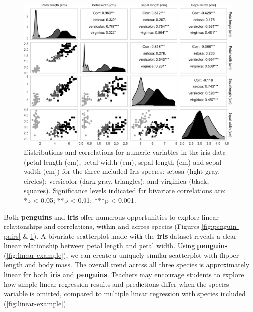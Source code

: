 \begin{Schunk}
\begin{figure}

{\centering \includegraphics[width=1\linewidth]{figs/iris-pairs-1} 

}

\caption[Distributions and correlations for numeric variables in the iris data (petal length (cm), petal width (cm), sepal length (cm) and sepal width (cm)) for the three included Iris species]{Distributions and correlations for numeric variables in the iris data (petal length (cm), petal width (cm), sepal length (cm) and sepal width (cm)) for the three included Iris species: setosa (light gray, circles); versicolor (dark gray, triangles); and virginica (black, squares). Significance levels indicated for bivariate correlations are: *p < 0.05; **p < 0.01; ***p < 0.001.}\label{fig:iris-pairs}
\end{figure}
\end{Schunk}

Both \textbf{penguins} and \textbf{iris} offer numerous opportunities to
explore linear relationships and correlations, within and across species
(Figures \ref{fig:penguin-pairs} \& \ref{fig:iris-pairs}). A bivariate
scatterplot made with the \textbf{iris} dataset reveals a clear linear
relationship between petal length and petal width. Using
\textbf{penguins} (\ref{fig:linear-example}), we can create a uniquely
similar scatterplot with flipper length and body mass. The overall trend
across all three species is approximately linear for both \textbf{iris}
and \textbf{penguins}. Teachers may encourage students to explore how
simple linear regression results and predictions differ when the species
variable is omitted, compared to multiple linear regression with species
included (\ref{fig:linear-example}).

